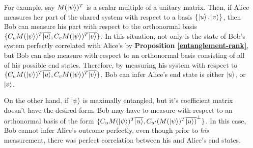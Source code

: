 For example, say $M(\ket{\psi})^T$ is a scalar multiple of a unitary matrix.  Then, if Alice measures her part of the shared system with respect to a basis $\{\ket{u}, \ket{v}\}$, then 
Bob can measure his part with respect to the orthonormal basis $\{C_u M(\ket{\psi})^T\overline{\ket{u}}, C_v M(\ket{\psi})^T\overline{\ket{v}}\}$. In this situation, not only is the state of Bob's system perfectly correlated with Alice's by \textbf{Proposition \ref{entanglement-rank}}, but Bob can also measure with respect to an orthonormal basis consisting of all of his possible end states.  Therefore, by measuring his system with respect to $\{C_u M(\ket{\psi})^T\overline{\ket{u}}, C_v M(\ket{\psi})^T\overline{\ket{v}}\}$, Bob can infer Alice's end state is either $\ket{u}$, or $\ket{v}$.

On the other hand, if $\ket{\psi}$ is maximally entangled, but it's coefficient matrix doesn't have the desired form, Bob may have to measure with respect to an orthonormal basis of the form $\{C_u M(\ket{\psi})^T\overline{\ket{u}}, C_{u'}(M(\ket{\psi})^T\overline{\ket{u})}^\perp \}$.  In this case, Bob cannot infer Alice's outcome perfectly, even though prior to {\emph{his}} measurement, there was perfect correlation between his and Alice's end states.  

